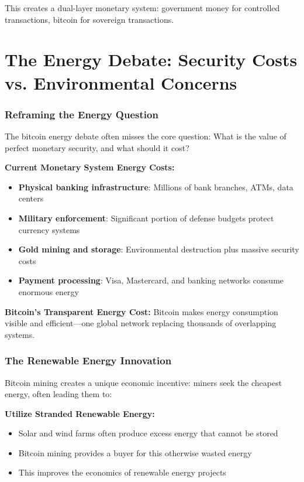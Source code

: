 \documentclass[11pt,oneside]{book}
\begin{document}
This creates a dual-layer monetary system: government money for controlled transactions, bitcoin for sovereign transactions.

\section{The Energy Debate: Security Costs vs. Environmental Concerns}

\subsubsection{Reframing the Energy Question}

The bitcoin energy debate often misses the core question: What is the value of perfect monetary security, and what should it cost?

\textbf{Current Monetary System Energy Costs:}
\begin{itemize}
\item \textbf{Physical banking infrastructure}: Millions of bank branches, ATMs, data centers
\item \textbf{Military enforcement}: Significant portion of defense budgets protect currency systems
\item \textbf{Gold mining and storage}: Environmental destruction plus massive security costs
\item \textbf{Payment processing}: Visa, Mastercard, and banking networks consume enormous energy
\end{itemize}

\textbf{Bitcoin's Transparent Energy Cost:}
Bitcoin makes energy consumption visible and efficient—one global network replacing thousands of overlapping systems.

\subsubsection{The Renewable Energy Innovation}

Bitcoin mining creates a unique economic incentive: miners seek the cheapest energy, often leading them to:

\textbf{Utilize Stranded Renewable Energy:}
\begin{itemize}
\item Solar and wind farms often produce excess energy that cannot be stored
\item Bitcoin mining provides a buyer for this otherwise wasted energy
\item This improves the economics of renewable energy projects
\end{itemize}
\end{document}
